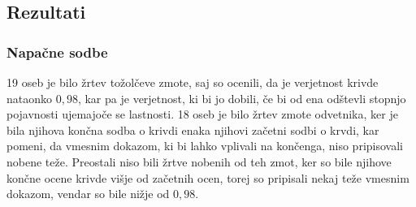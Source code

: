 \documentclass[12pt,a4paper]{amsart}
\theoremstyle{definition} %
\theoremstyle{plain} %
\begin{document}
\subsection{Rezultati}
\subsubsection{Napačne sodbe}
19 oseb je bilo žrtev tožolčeve zmote, saj so ocenili, da je verjetnost krivde nataonko $0,98$, kar pa je verjetnost, ki bi jo dobili, če bi od ena 
odštevli stopnjo pojavnosti ujemajoče se lastnosti. 18 oseb je bilo žrtev zmote odvetnika, ker je bila njihova končna sodba o krivdi enaka njihovi začetni sodbi 
o krvdi, kar pomeni, da vmesnim dokazom, ki bi lahko vplivali na končenga, niso pripisovali nobene teže. Preostali niso bili žrtve nobenih od teh zmot, ker so bile 
njihove končne ocene krivde višje od začetnih ocen, torej so pripisali nekaj teže vmesnim dokazom, vendar so bile nižje od $0,98$.
\end{document}
